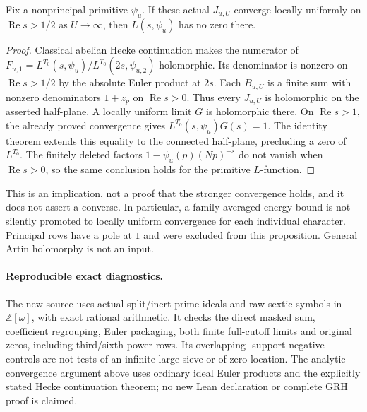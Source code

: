 \begin{theorem}
\label{rc:boundary}
Fix a nonprincipal primitive $\psi_u$. If these actual $J_{u,U}$
converge locally uniformly on $\operatorname{Re}s>1/2$ as
$U\longrightarrow\infty$, then $L(s,\psi_u)$ has no zero there.
\end{theorem}
\begin{proof}
Classical abelian Hecke continuation makes the numerator of
$F_{u,1}=L^{T_0}(s,\psi_u)/L^{T_0}(2s,\psi_{u,2})$ holomorphic.
Its denominator is nonzero on $\operatorname{Re}s>1/2$ by the
absolute Euler product at $2s$. Each $B_{u,U}$ is a finite sum with
nonzero denominators $1+z_p$ on $\operatorname{Re}s>0$.
Thus every $J_{u,U}$ is holomorphic on the asserted half-plane.
A locally uniform limit $G$ is holomorphic there. On
$\operatorname{Re}s>1$, the already proved convergence gives
$L^{T_0}(s,\psi_u)G(s)=1$. The identity theorem extends this equality
to the connected half-plane, precluding a zero of $L^{T_0}$.
The finitely deleted factors $1-\psi_u(p)(Np)^{-s}$ do not vanish
when $\operatorname{Re}s>0$, so the same conclusion holds for the
primitive $L$-function.
\end{proof}
This is an implication, not a proof that the stronger convergence holds,
and it does not assert a converse. In particular, a family-averaged energy
bound is not silently promoted to locally uniform convergence for each
individual character. Principal rows have a pole at $1$ and were excluded
from this proposition. General Artin holomorphy is not an input.

\paragraph{Reproducible exact diagnostics.}
The new source 
uses actual split/inert prime ideals and raw sextic symbols in
$\mathbb Z[\omega]$, with exact rational arithmetic. It checks the direct
masked sum, coefficient regrouping, Euler packaging, both finite full-cutoff
limits and original zeros, including third/sixth-power rows. Its overlapping-
support negative controls are not tests of an infinite large sieve or of
zero location. The analytic convergence argument above uses ordinary ideal
Euler products and the explicitly stated Hecke continuation theorem; no
new Lean declaration or complete GRH proof is claimed.

